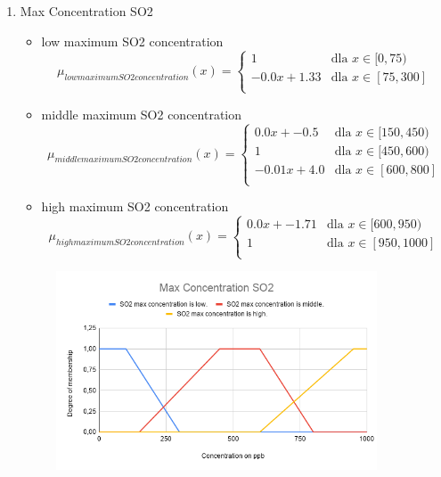 \documentclass{classrep}
\begin{document}
{{\begin{enumerate}
                \item Max Concentration SO2
                \begin{itemize}
                    \item low maximum SO2 concentration
\begin{displaymath}
\mu_{low maximum SO2 concentration}(x) = \left\{ \begin{array}{ll}
1 & \textrm{dla $x \in [0, 75)$}\\
-0.0x + 1.33 & \textrm{dla $x \in [75, 300]$}\\
\end{array} \right.
\end{displaymath}
                    \item middle maximum SO2 concentration
\begin{displaymath}
\mu_{middle maximum SO2 concentration}(x) = \left\{ \begin{array}{ll}
0.0x + -0.5 & \textrm{dla $x \in [150, 450)$}\\
1 & \textrm{dla $x \in [450, 600)$}\\
-0.01x + 4.0 & \textrm{dla $x \in [600, 800]$}\\
\end{array} \right.
\end{displaymath}
                    \item high maximum SO2 concentration
\begin{displaymath}
\mu_{high maximum SO2 concentration}(x) = \left\{ \begin{array}{ll}
0.0x + -1.71 & \textrm{dla $x \in [600, 950)$}\\
1 & \textrm{dla $x \in [950, 1000]$}\\
\end{array} \right.
\end{displaymath}
                \end{itemize}
                \begin{figure}[!htbp]
                    \centering
                    \includegraphics[width=0.9\textwidth]{img/theory/MaxConcentrationSO2.png}

\end{figure}
\end{enumerate}}}
\end{document}
